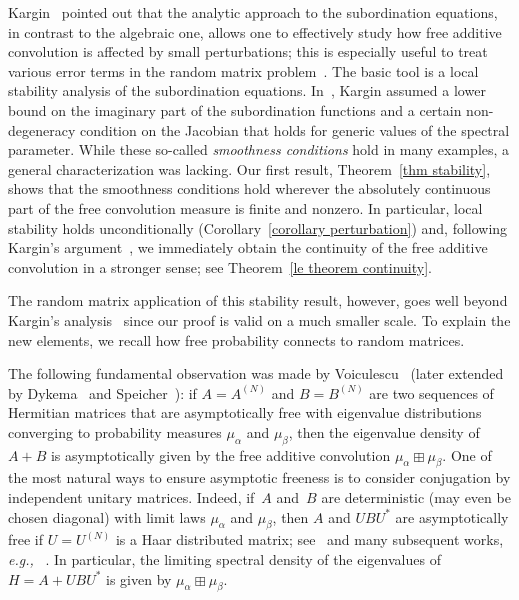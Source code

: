 \documentclass[10pt,reqno]{amsart}
\numberwithin{equation}{section}
\theoremstyle{plain}
\numberwithin{kevin}{section}
\theoremstyle{remark}
\newcommand{\eg}{\emph{e.g., }}
\begin{document}
 
Kargin~\cite{Kargin2013} pointed out 
that the analytic approach to the subordination equations, in contrast to the algebraic one,
allows one to effectively study how free additive convolution is affected by small perturbations;
this is especially useful to treat various error terms in the random matrix problem~\cite{Kargin}.
The basic tool is a local stability analysis of the subordination equations. In~\cite{Kargin2013}, Kargin assumed a lower bound on the imaginary part of the subordination functions
and a certain non-degeneracy condition on the Jacobian that holds for generic values of the spectral parameter.
While these so-called {\it smoothness conditions} hold 
in many examples, 
a general characterization was lacking.
Our first result, Theorem~\ref{thm stability}, shows that the smoothness
 conditions hold wherever the absolutely continuous part of
the free convolution measure is finite and  nonzero. In particular,  local stability holds unconditionally
(Corollary~\ref{corollary perturbation}) 
and, following  Kargin's argument~\cite{Kargin2013}, we immediately obtain the continuity of the free additive convolution in a stronger sense; see Theorem~\ref{le theorem continuity}.



The random matrix application of this stability result, however, goes well beyond Kargin's analysis~\cite{Kargin}
since our proof is valid on a much smaller scale. To explain the new elements, we recall how free probability connects to random matrices.



The following fundamental observation was made by Voiculescu~\cite{Voi91}
(later extended by Dykema~\cite{Dyk93b} and Speicher~\cite{Spe94}): if
$A=A^{(N)}$ and $B=B^{(N)}$ are two sequences of  Hermitian matrices that are asymptotically free with eigenvalue
distributions converging to probability measures $\mu_\alpha$ and $\mu_\beta$, then the eigenvalue density of $A+B$ is asymptotically given
by the free additive convolution $\mu_\alpha\boxplus\mu_\beta$.
 One of the most natural ways to
ensure asymptotic freeness is to consider conjugation by independent unitary matrices. Indeed,
if~$A$ and~$B$ are deterministic (may even be chosen diagonal)
with limit laws $\mu_\alpha$ and $\mu_\beta$, then $A$ and $UBU^*$ are asymptotically free if $U=U^{(N)}$ is a Haar distributed matrix; see~\cite{Voi91} and many subsequent works, \eg~\cite{Spe93,Xu97,Bia98bis,VP,Col03}. In particular, the limiting spectral density of the eigenvalues of $H=A+UBU^*$ is given by 
$\mu_\alpha\boxplus\mu_\beta$.
\end{document}

